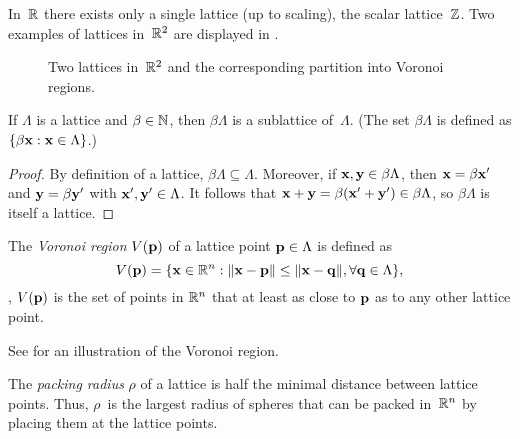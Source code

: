 \begin{subappendices}
  \begin{example}
    \label{ex:scalarlattice}
    In~$\mathbb{R}$ there exists only a single lattice (up to scaling), the scalar
    lattice~$\mathbb{Z}$. Two examples of lattices in~$\mathbb{R}^2$ are displayed in
    .
  \end{example}
  \begin{figure}[tbp]
    \centerline{%
    \hfil
    }
    \caption{Two lattices in~$\mathbb{R}^2$ and the corresponding partition into Voronoi
    regions.}
    \label{fig:r2lattices}
  \end{figure}
  \begin{proposition}
    \label{prop:intsublattice}
    If $\Lambda$ is a lattice and $\beta \in {\mathbb{N}}$, then $\beta \Lambda$ is a
    sublattice of~$\Lambda$. (The set $\beta \Lambda$ is defined as $\{ \beta \mathbf{x}
    : \mathbf{x} \in \Lambda\}$.)
  \end{proposition}

  \begin{proof}
    By definition of a lattice, $\beta \Lambda \subseteq \Lambda$. Moreover, if
    $\mathbf{x}, \mathbf{y} \in \beta \Lambda$, then $\mathbf{x} = \beta \mathbf{x}'$ and $\mathbf{y} = \beta \mathbf{y}'$ with
    $\mathbf{x}', \mathbf{y}' \in \Lambda$. It follows that $\mathbf{x} + \mathbf{y} = \beta (\mathbf{x}' + \mathbf{y}') \in \beta
    \Lambda$, so $\beta\Lambda$ is itself a lattice.
  \end{proof}

  \begin{definition}
    The \emph{Voronoi region} $V(\mathbf{p})$ of a lattice point $\mathbf{p} \in \Lambda$ is
    defined as \begin{equation*} V(\mathbf{p}) = \{\mathbf{x} \in \mathbb{R}^n : \|\mathbf{x} - \mathbf{p}\| \le \|\mathbf{x} -
      \mathbf{q}\|, \forall \mathbf{q} \in \Lambda\}, \end{equation*} \ie, $V(\mathbf{p})$ is the set of
      points in $\mathbb{R}^n$ that at least as close to $\mathbf{p}$ as to any other lattice
      point.
  \end{definition}
  See  for an illustration of the Voronoi region.

  \begin{definition}
    The \emph{packing radius} $\rho$ of a lattice is half the minimal distance
    between lattice points. Thus, $\rho$~is the largest radius of spheres that
    can be packed in~$\mathbb{R}^n$ by placing them at the lattice points.
  \end{definition}


\end{subappendices}
